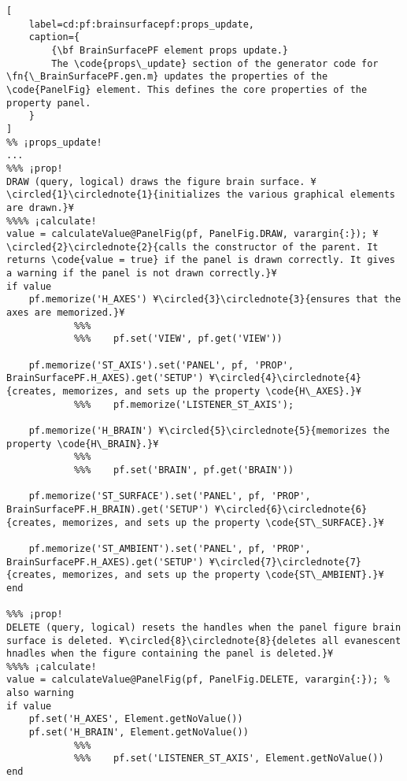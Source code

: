 \documentclass{tufte-handout}
\begin{document}
\begin{lstlisting}[
	label=cd:pf:brainsurfacepf:props_update,
	caption={
		{\bf BrainSurfacePF element props update.}
		The \code{props\_update} section of the generator code for \fn{\_BrainSurfacePF.gen.m} updates the properties of the \code{PanelFig} element. This defines the core properties of the property panel.
	}
]
%% ¡props_update!
...
%%% ¡prop!
DRAW (query, logical) draws the figure brain surface. ¥\circled{1}\circlednote{1}{initializes the various graphical elements are drawn.}¥
%%%% ¡calculate!
value = calculateValue@PanelFig(pf, PanelFig.DRAW, varargin{:}); ¥\circled{2}\circlednote{2}{calls the constructor of the parent. It returns \code{value = true} if the panel is drawn correctly. It gives a warning if the panel is not drawn correctly.}¥
if value
    pf.memorize('H_AXES') ¥\circled{3}\circlednote{3}{ensures that the axes are memorized.}¥
            %%%        
            %%%    pf.set('VIEW', pf.get('VIEW'))

    pf.memorize('ST_AXIS').set('PANEL', pf, 'PROP', BrainSurfacePF.H_AXES).get('SETUP') ¥\circled{4}\circlednote{4}{creates, memorizes, and sets up the property \code{H\_AXES}.}¥
            %%%    pf.memorize('LISTENER_ST_AXIS');
    
    pf.memorize('H_BRAIN') ¥\circled{5}\circlednote{5}{memorizes the property \code{H\_BRAIN}.}¥
            %%%    
            %%%    pf.set('BRAIN', pf.get('BRAIN'))

    pf.memorize('ST_SURFACE').set('PANEL', pf, 'PROP', BrainSurfacePF.H_BRAIN).get('SETUP') ¥\circled{6}\circlednote{6}{creates, memorizes, and sets up the property \code{ST\_SURFACE}.}¥
    
    pf.memorize('ST_AMBIENT').set('PANEL', pf, 'PROP', BrainSurfacePF.H_AXES).get('SETUP') ¥\circled{7}\circlednote{7}{creates, memorizes, and sets up the property \code{ST\_AMBIENT}.}¥
end

%%% ¡prop!
DELETE (query, logical) resets the handles when the panel figure brain surface is deleted. ¥\circled{8}\circlednote{8}{deletes all evanescent hnadles when the figure containing the panel is deleted.}¥
%%%% ¡calculate!
value = calculateValue@PanelFig(pf, PanelFig.DELETE, varargin{:}); % also warning
if value
    pf.set('H_AXES', Element.getNoValue())
    pf.set('H_BRAIN', Element.getNoValue())
            %%%    
            %%%    pf.set('LISTENER_ST_AXIS', Element.getNoValue())
end


\end{lstlisting}
\end{document}
